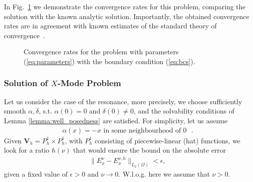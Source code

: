 In Fig.~\ref{fig:conv_rate} we demonstrate the convergence rates for this problem, comparing the solution with the 
known analytic solution. Importantly, the obtained convergence rates are in agreement with known estimates of the standard theory of convergence~\cite{brenner}.
\begin{figure}
    \caption{Convergence rates for the problem with parameters (\ref{eq:parameters}) with the boundary condition (\ref{eq:bcs}).}
    \label{fig:conv_rate}
\end{figure}
\subsubsection{Solution of $X$-Mode Problem}
Let us consider the case of the resonance, more precisely, we choose sufficiently smooth
$\alpha,\delta$, s.t. $\alpha(0)=0$ and $\delta(0)\neq 0$, and the solvability conditions 
of Lemma \ref{lemma:well_posedness}  are satisfied. 
For simplicity, let us assume 
\begin{align}
\label{eq:cond}
 \alpha(x)=-x \text{  in some neighbourhood of $0$ }.
\end{align}
Given $\mathbf{V}_{h}=P_{h}^{1}\times P_{h}^{1}$, with $P_{h}^{1}$ consisting of piecewise-linear (hat) functions, 
we look for a ratio $h(\nu)$ that would ensure the bound on the absolute error 
\begin{align}
\label{eq:problem1}
\|E^{\nu}_{x}-E^{\nu,h}_{x}\|_{L_{2}(\Omega)}<\epsilon,
\end{align}
given a fixed value of $\epsilon>0$ and $\nu\rightarrow 0$. W.l.o.g. here we assume that $\nu>0$. 

